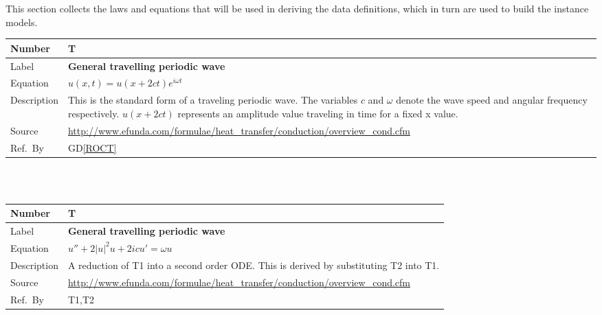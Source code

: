 \documentclass[12pt]{article}
\newcommand{\colAwidth}{0.13\textwidth}
\newcommand{\colBwidth}{0.82\textwidth}
\newcommand{\dref}[1]{GD\ref{#1}}
\newcounter{theorynum} %
\begin{document}
This section collects the laws and equations that will be used in deriving the
data definitions, which in turn are used to build the instance models.
~\newline
\noindent
\begin{minipage}{\textwidth}
	\renewcommand*{\arraystretch}{1.5}
	\begin{tabular}{| p{\colAwidth} | p{\colBwidth}|}
		\hline
		\rowcolor[gray]{0.9}
		Number& T{theorynum}\thetheorynum \label{T_COE}\\
		\hline
		Label&\bf General travelling periodic wave\\
		\hline
		Equation&  $ u(x,t)=u(x+2ct)e^{i\omega t}$\\
		\hline
		Description & 
		This is the standard form of a traveling periodic wave. The variables 
		$c$ and $\omega$ denote the wave speed and angular frequency 
		respectively. $u(x+2ct)$ represents an amplitude value traveling in 
		time for a fixed x value.\\
		\hline
		Source &
		\url{http://www.efunda.com/formulae/heat_transfer/conduction/overview_cond.cfm}\\
		\hline
		Ref.\ By & \dref{ROCT}\\
		\hline
	\end{tabular}
\end{minipage}\\

~\newline

\noindent
\begin{minipage}{\textwidth}
	\renewcommand*{\arraystretch}{1.5}
	\begin{tabular}{| p{\colAwidth} | p{\colBwidth}|}
		\hline
		\rowcolor[gray]{0.9}
		Number& T{theorynum}\thetheorynum \label{T_COE}\\
		\hline
		Label&\bf General travelling periodic wave\\
		\hline
		Equation&  $ u'' + 2|u|^{2}u+2icu'=\omega u$\\
		\hline
		Description & 
		A reduction of T1 into a second order ODE. This is derived by 
		substituting T2 into T1. \\
		\hline
		Source &
		\url{http://www.efunda.com/formulae/heat_transfer/conduction/overview_cond.cfm}\\
		\hline
		Ref.\ By & T1,T2\\
		\hline
	\end{tabular}
\end{minipage}\\
\end{document}
